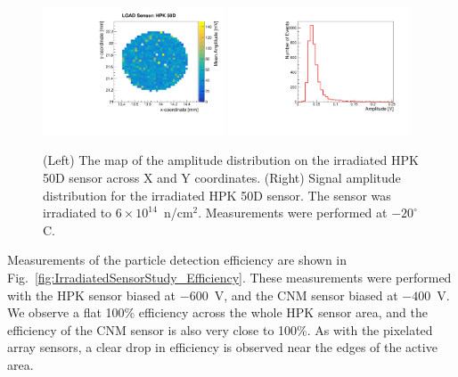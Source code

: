\documentclass[preprint,1p]{elsarticle}
\begin{document}
\begin{figure}[htbp] 
\centering
\includegraphics[width=0.48\textwidth]{figs/USCSBoard_HPK50DIrradiated-CNMW11LGA35_Run936-961/HPK_irradiated_amp_Map.pdf} \hfill
\includegraphics[width=0.48\textwidth]{figs/USCSBoard_HPK50DIrradiated-CNMW11LGA35_Run936-961/HPK_irradiated_amp_1D.pdf} 
\caption{(Left) The map of the amplitude distribution on the irradiated HPK 50D sensor across X and Y coordinates. (Right) Signal amplitude distribution for the irradiated HPK 50D sensor. The sensor was irradiated to $6\times 10^{14}$~n/cm$^2$. Measurements were performed at $-20^{\circ}$C.} 
\label{fig:HPK_irradiated_amp_Map} 
\end{figure} 

Measurements of the particle detection efficiency are shown in
Fig.~\ref{fig:IrradiatedSensorStudy_Efficiency}. These measurements were
performed with the HPK sensor biased at $-600$~V, and the CNM sensor biased at
$-400$~V. We observe a flat 100\% efficiency across the whole HPK sensor area, and
the efficiency of the CNM sensor is also very close to 100\%. As with the
pixelated array sensors, a clear drop in efficiency is observed near the edges
of the active area. 
\end{document}
